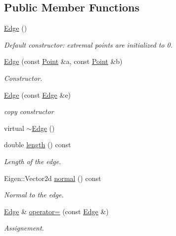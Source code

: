 \subsection*{Public Member Functions}
\begin{DoxyCompactItemize}
\item 
\hyperlink{classTspeed_1_1Geo_1_1Edge_aa28485aab77e5643067380c86c35e6b5}{Edge} ()
\begin{DoxyCompactList}\small\item\em Default constructor\-: extremal points are initialized to 0. \end{DoxyCompactList}\item 
\hyperlink{classTspeed_1_1Geo_1_1Edge_aa0c751bf90737874583ef5dbf901f669}{Edge} (const \hyperlink{classTspeed_1_1Geo_1_1Point}{Point} \&a, const \hyperlink{classTspeed_1_1Geo_1_1Point}{Point} \&b)
\begin{DoxyCompactList}\small\item\em Constructor. \end{DoxyCompactList}\item 
\hyperlink{classTspeed_1_1Geo_1_1Edge_a48bde3f5e50244cacc38226156aa124c}{Edge} (const \hyperlink{classTspeed_1_1Geo_1_1Edge}{Edge} \&e)
\begin{DoxyCompactList}\small\item\em copy constructor \end{DoxyCompactList}\item 
virtual \hyperlink{classTspeed_1_1Geo_1_1Edge_a76fa8e882724d339873d8ce89b827e89}{$\sim$\-Edge} ()
\item 
double \hyperlink{classTspeed_1_1Geo_1_1Edge_ac58cbabc588765cb501470fd0281a12e}{length} () const 
\begin{DoxyCompactList}\small\item\em Length of the edge. \end{DoxyCompactList}\item 
Eigen\-::\-Vector2d \hyperlink{classTspeed_1_1Geo_1_1Edge_af7c463f06cab88d0f4d15bb5adc3272c}{normal} () const 
\begin{DoxyCompactList}\small\item\em Normal to the edge. \end{DoxyCompactList}\item 
\hyperlink{classTspeed_1_1Geo_1_1Edge}{Edge} \& \hyperlink{classTspeed_1_1Geo_1_1Edge_ad0d71349f5890f4e8abc62b44142b75b}{operator=} (const \hyperlink{classTspeed_1_1Geo_1_1Edge}{Edge} \&)
\begin{DoxyCompactList}\small\item\em Assignement. \end{DoxyCompactList}\end{DoxyCompactItemize}
